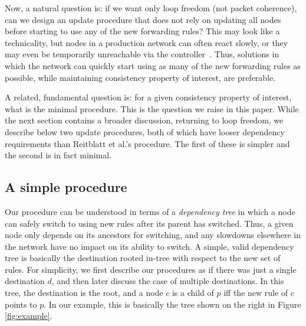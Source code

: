 Now, a natural question is: if we want only loop freedom (not packet coherence), can we design an update procedure that does not rely on updating all nodes before starting to use any of the new forwarding rules?  This may look like a technicality, but nodes in a production network can often react slowly, or they may even be temporarily unreachable via the controller~\cite{b4}.  Thus, solutions in which the network can quickly start using as many of the new forwarding rules as possible, while maintaining consistency property of interest, are preferable.

A related, fundamental question is: for a given consistency property of interest, what is the minimal procedure. This is the question we raise in this paper. While the next section contains a broader discussion, returning to loop freedom, we describe below two update procedures, both of which have looser dependency requirements than Reitblatt et al.'s procedure.  The first of these is simpler and the second is in fact minimal.



\subsection{A simple procedure}
\label{sec:practical}


Our procedure can be understood in terms of a {\em dependency tree} in which a node can safely switch to using new rules after its parent has switched. Thus, a given node only depends on its ancestors for switching, and any slowdowns elsewhere in the network have no impact on its ability to switch. A simple, valid dependency tree is basically the destination rooted in-tree with respect to the new set of rules. For simplicity, we first describe our procedures as if there was just a single destination $d$, and then later discuss the case of multiple destinations. In this tree, the destination is the root, and a node $c$ is a child of $p$ iff the new rule of $c$ points to $p$. In our example, this is basically the tree shown on the right in Figure \ref{fig:example}.

